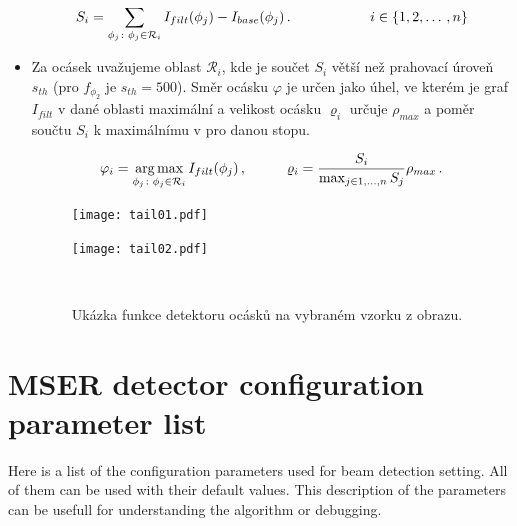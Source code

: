 \begin{itemize}
	\begin{equation}
	S_i = \sum_{\phi_j \colon \phi_j \in \mathcal{R}_i}I_{filt}(\phi_j)-I_{base}(\phi_j)\,. \hspace*{2cm} i \in \left\lbrace 1, 2, \dots \,, n \right\rbrace
	\label{eq:Rsuma}
	\end{equation}
	
	\item Za ocásek uvažujeme oblast $\mathcal{R}_i$, kde je součet $S_i$ větší než prahovací úroveň $s_{th}$ (pro $f_{\phi_2}$ je $s_{th} = 500$). Směr ocásku $\varphi$ je určen jako úhel, ve kterém je graf $I_{filt}$ v dané oblasti maximální a velikost ocásku $\varrho_i$ určuje $\rho_{max}$ a poměr součtu $S_i$ k maximálnímu v pro danou stopu.  
	
	\begin{equation}
	\varphi_i = \operatorname*{arg\,max}_{\phi_j \colon \phi_j \in \mathcal{R}_i}I_{filt}(\phi_j) \,, \hspace{1cm} \varrho_i = \frac{S_i}{\max_{j \in 1,\dots , n}S_j}\rho_{max}\,.
	\label{eq:tail_params}
	\end{equation}
		
	\begin{figure}[htbp]
    \centering
    \begin{minipage}[c]{0.48\textwidth}
        \centering\texttt{[image: tail01.pdf]}
    \end{minipage}
    \begin{minipage}[c]{0.48\textwidth}
        \centering\texttt{[image: tail02.pdf]}
    \end{minipage}
    \\
        \caption[Detektor ocásků - příklad detekce.]{Ukázka funkce detektoru ocásků na vybraném vzorku z obrazu. }
        \label{Detekce}
\end{figure}


	
	
\end{itemize}	   
	
	

\section{MSER detector configuration parameter list}	
	Here is a list of the configuration parameters used for beam detection setting. All of them can be used with their default values. This description of the parameters can be usefull for understanding the algorithm or debugging.
	
